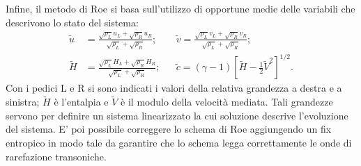 Infine, il metodo di Roe si basa sull'utilizzo di opportune medie delle variabili che descrivono lo stato del sistema:
\begin{equation*}
\begin{aligned}
\tilde{u} &= \frac{\sqrt{\rho_L} u_L + \sqrt{\rho_R} u_R}{\sqrt{\rho_L} + \sqrt{\rho_R}}; 
&&\tilde{v} = \frac{\sqrt{\rho_L} v_L + \sqrt{\rho_R} v_R}{\sqrt{\rho_L} + \sqrt{\rho_R}}; \\
\tilde{H} &= \frac{\sqrt{\rho_L} H_L + \sqrt{\rho_R} H_R}{\sqrt{\rho_L} + \sqrt{\rho_R}}; 
&&\tilde{c} = (\gamma - 1) \left[\tilde{H} - \frac{1}{2} \tilde{V}^{2} \right] ^{1/2}.
\end{aligned}
\end{equation*}
Con i pedici L e R si sono indicati i valori della relativa grandezza a destra e a sinistra; $\tilde{H}$ è l'entalpia e $\tilde{V}$ è il modulo della velocità mediata.
Tali grandezze servono per definire un sistema linearizzato la cui soluzione descrive l'evoluzione del sistema. E' poi possibile correggere lo schema di Roe aggiungendo un fix entropico in modo tale da garantire che lo schema legga correttamente le onde di rarefazione transoniche.